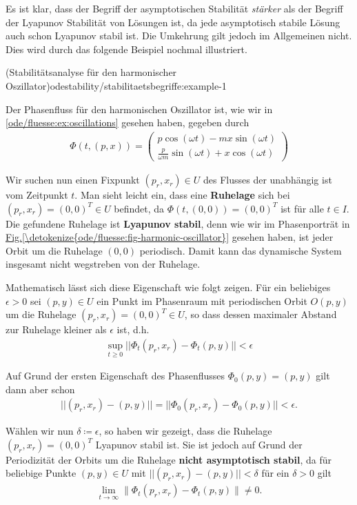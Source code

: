 \documentclass[letterpaper,10pt,english]{jupyterBook}
\begin{document}
\par
Es ist klar, dass der Begriff der asymptotischen Stabilität \emph{stärker} als der Begriff der Lyapunov Stabilität von Lösungen ist, da jede asymptotisch stabile Lösung auch schon Lyapunov stabil ist.
Die Umkehrung gilt jedoch im Allgemeinen nicht.
Dies wird durch das folgende Beispiel nochmal illustriert.
\begin{example}{(Stabilitätsanalyse für den harmonischer Oszillator)}{odestability/stabilitaetsbegriffe:example-1}



\par
Der Phasenfluss für den harmonischen Oszillator ist, wie wir in \cref{ode/fluesse:ex:oscillations} gesehen haben, gegeben durch
\begin{align*}
\Phi(t, (p,x)) = \begin{pmatrix}
p \cos(\omega t) - m x \sin(\omega t)\\
\frac{p}{\omega m}\sin(\omega t) + x\cos(\omega t)
\end{pmatrix}
\end{align*}
\par
Wir suchen nun einen Fixpunkt \((p_r,x_r) \in U\) des Flusses der unabhängig ist vom Zeitpunkt \(t\).
Man sieht leicht ein, dass eine \textbf{Ruhelage} sich bei \((p_r,x_r) = (0,0)^T \in U\) befindet, da \(\Phi(t,(0,0)) = (0,0)^T\) ist für alle \(t \in I\).
Die gefundene Ruhelage ist \textbf{Lyapunov stabil}, denn wie wir im Phasenporträt in \hyperref[\detokenize{ode/fluesse:fig-harmonic-oscillator}]{Fig.\@ \ref{\detokenize{ode/fluesse:fig-harmonic-oscillator}}} gesehen haben, ist jeder Orbit um die Ruhelage \((0,0)\) periodisch. Damit kann das dynamische System insgesamt nicht wegstreben von der Ruhelage.

\par
Mathematisch lässt sich diese Eigenschaft wie folgt zeigen.
Für ein beliebiges \(\epsilon > 0\) sei \((p,y) \in U\) ein Punkt im Phasenraum mit periodischen Orbit \(O(p,y)\) um die Ruhelage \((p_r,x_r) = (0,0)^T \in U\), so dass dessen maximaler Abstand zur Ruhelage kleiner als \(\epsilon\) ist, d.h.
\begin{align*}
\sup_{t \geq 0} ||\Phi_t(p_r,x_r) - \Phi_t(p,y)|| < \epsilon
\end{align*}
\par
Auf Grund der ersten Eigenschaft des Phasenflusses \(\Phi_0(p,y) = (p,y)\) gilt dann aber schon
\begin{align*}
||(p_r, x_r) - (p,y)|| = ||\Phi_0(p_r, x_r) - \Phi_0(p,y)|| < \epsilon.
\end{align*}
\par
Wählen wir nun \(\delta \coloneqq \epsilon\), so haben wir gezeigt, dass die Ruhelage \((p_r, x_r) = (0,0)^T\) Lyapunov stabil ist.
Sie ist jedoch auf Grund der Periodizität der Orbits um die Ruhelage \textbf{nicht asymptotisch stabil}, da für beliebige Punkte \((p,y) \in U\) mit \(||(p_r,x_r) - (p,y)|| < \delta\) für ein \(\delta > 0\) gilt
\begin{align*}
\lim_{t\to\infty}\|\Phi_t(p_r, x_r)-\Phi_t(p,y)\| \neq 0.
\end{align*}\end{example}
\end{document}
